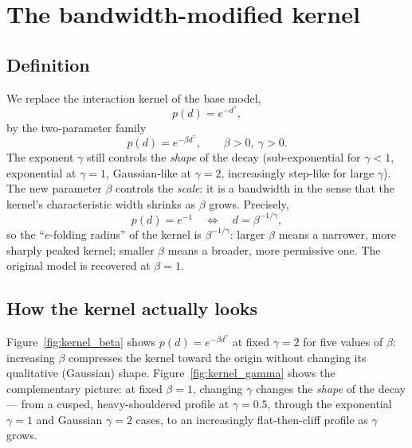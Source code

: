 \documentclass[11pt,a4paper]{article}
\theoremstyle{plain}
\theoremstyle{definition}
\theoremstyle{remark}
\newcommand{\bw}{\beta}
\begin{document}
\section{The bandwidth-modified kernel}
\label{sec:kernel}

\subsection{Definition}

We replace the interaction kernel of the base model,
\[
  p(d)=e^{-d^{\gamma}},
\]
by the two-parameter family
\begin{equation}
  \boxed{
  p(d)=e^{-\bw d^{\gamma}},
  \qquad \bw>0,\ \gamma>0.
  }
  \label{eq:kernel_def}
\end{equation}
The exponent $\gamma$ still controls the \emph{shape} of the decay
(sub-exponential for $\gamma<1$, exponential at $\gamma=1$, Gaussian-like at
$\gamma=2$, increasingly step-like for large $\gamma$). The new parameter
$\bw$ controls the \emph{scale}: it is a bandwidth in the sense that the
kernel's characteristic width shrinks as $\bw$ grows. Precisely,
\[
  p(d)=e^{-1}
  \quad\Longleftrightarrow\quad
  d=\bw^{-1/\gamma},
\]
so the ``$e$-folding radius'' of the kernel is $\bw^{-1/\gamma}$: larger
$\bw$ means a narrower, more sharply peaked kernel; smaller $\bw$ means a
broader, more permissive one. The original model is recovered at $\bw=1$.

\subsection{How the kernel actually looks}

Figure~\ref{fig:kernel_beta} shows $p(d)=e^{-\bw d^{\gamma}}$ at fixed
$\gamma=2$ for five values of $\bw$: increasing $\bw$ compresses the kernel
toward the origin without changing its qualitative (Gaussian) shape.
Figure~\ref{fig:kernel_gamma} shows the complementary picture: at fixed
$\bw=1$, changing $\gamma$ changes the \emph{shape} of the decay — from a
cusped, heavy-shouldered profile at $\gamma=0.5$, through the exponential
$\gamma=1$ and Gaussian $\gamma=2$ cases, to an increasingly flat-then-cliff
profile as $\gamma$ grows.
\end{document}
